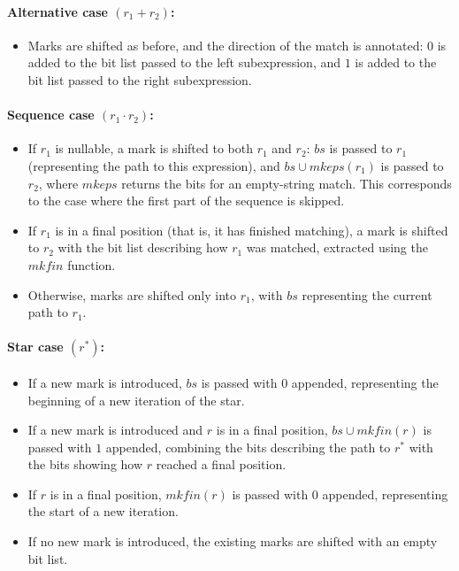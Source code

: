 \documentclass[12pt]{article}
\newcommand{\mkeps}{\textit{mkeps}}
\newcommand{\mkfin}{\textit{mkfin}}
\begin{document}
\paragraph*{\textbf{Alternative case} $(r_1 + r_2)$:}

\begin{itemize}
  \item Marks are shifted as before, and the direction of the match is annotated:  
  $0$ is added to the bit list passed to the left subexpression,  
  and $1$ is added to the bit list passed to the right subexpression.
\end{itemize}

\paragraph*{\textbf{Sequence case} $(r_1 \cdot r_2)$:}
\begin{itemize}
    \item If $r_1$ is nullable, a mark is shifted to both $r_1$ and $r_2$:  
    $bs$ is passed to $r_1$ (representing the path to this expression),  
    and $bs \cup \mkeps(r_1)$ is passed to $r_2$, where $\mkeps$ returns the bits for an empty-string match.  
    This corresponds to the case where the first part of the sequence is skipped.  
    \item If $r_1$ is in a final position (that is, it has finished matching),  
    a mark is shifted to $r_2$ with the bit list describing how $r_1$ was matched,  
    extracted using the $\mkfin$ function.  
    \item Otherwise, marks are shifted only into $r_1$, with $bs$ representing the current path to $r_1$.  
\end{itemize}

\paragraph*{\textbf{Star case} $(r^*)$:}
\begin{itemize}
    \item If a new mark is introduced, $bs$ is passed with $0$ appended,  
    representing the beginning of a new iteration of the star.  
    \item If a new mark is introduced and $r$ is in a final position,  
    $bs \cup \mkfin(r)$ is passed with $1$ appended, combining the bits describing the path to $r^*$  
    with the bits showing how $r$ reached a final position.  
    \item If $r$ is in a final position, $\mkfin(r)$ is passed with $0$ appended,  
    representing the start of a new iteration.  
    \item If no new mark is introduced, the existing marks are shifted with an empty bit list.  
\end{itemize}
\end{document}
